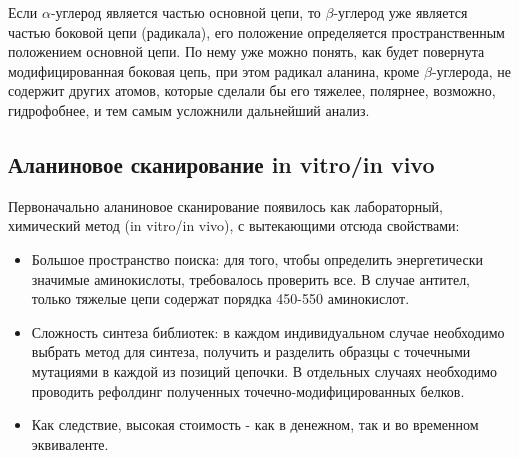 Если $\alpha$-углерод является частью основной цепи, то $\beta$-углерод уже является частью боковой цепи (радикала), его положение определяется пространственным положением основной цепи. По нему уже можно понять,  как будет повернута модифицированная боковая цепь, при этом радикал аланина, кроме $\beta$-углерода, не содержит других атомов, которые сделали бы его тяжелее, полярнее, возможно, гидрофобнее, и тем самым усложнили дальнейший анализ.

\subsection{Аланиновое сканирование in vitro/in vivo}
Первоначально аланиновое сканирование появилось как лабораторный, химический метод (in vitro/in vivo), с вытекающими отсюда свойствами:
\begin{itemize}
\item Большое пространство поиска: для того, чтобы определить энергетически значимые аминокислоты, требовалось проверить все. В случае антител, только тяжелые цепи содержат порядка 450-550 аминокислот.
\item Сложность синтеза библиотек: в каждом индивидуальном случае необходимо выбрать метод для синтеза, получить и разделить образцы с точечными мутациями в каждой из позиций цепочки. В отдельных случаях необходимо проводить рефолдинг полученных точечно-модифицированных белков.
\item Как следствие, высокая стоимость - как в денежном, так и во временном эквиваленте.
\end{itemize}

